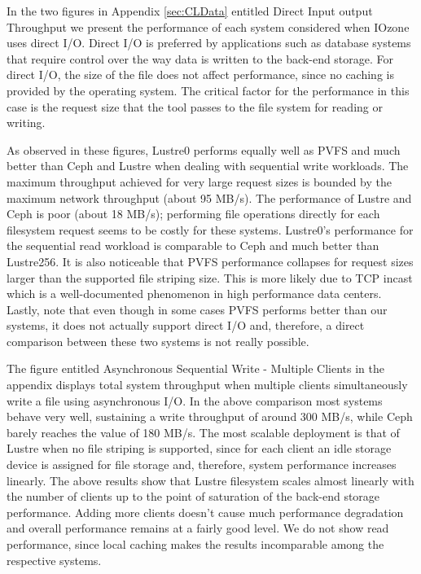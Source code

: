 \documentclass[11pt]{article}
\begin{document}
In the two figures in Appendix \ref{sec:CLData} entitled Direct Input output Throughput
we present the performance of each system considered when 
IOzone uses direct I/O. Direct I/O is preferred by applications such as 
database systems that require control over the way data is written to the 
back-end storage. For direct I/O, the size of the file does not affect 
performance, since no caching is provided by the operating system. The 
critical factor for the performance in this case is the request size that 
the tool passes to the file system for reading or writing.

As observed in these figures, Lustre0 performs equally well as PVFS and much 
better than Ceph and Lustre when dealing with sequential write workloads. 
The maximum throughput achieved for very large request sizes is bounded 
by the maximum network throughput (about 95 MB/s). The performance of 
Lustre and Ceph is poor (about 18 MB/s); performing file operations 
directly for each filesystem request seems to be costly for these systems. 
Lustre0’s performance for the sequential read workload is comparable to 
Ceph and much better than Lustre256. It is also noticeable that PVFS 
performance collapses for request sizes larger than the supported 
file striping size. This is more likely due to TCP incast which is a 
well-documented phenomenon in high performance data centers. Lastly, 
note that even though in some cases PVFS performs better than our 
systems, it does not actually support direct I/O and, therefore, a 
direct comparison between these two systems is not really possible.

The figure entitled Asynchronous Sequential Write - Multiple Clients 
in the appendix displays total system throughput when multiple clients 
simultaneously write a file using asynchronous I/O. In the above 
comparison most systems behave very well, sustaining a write throughput 
of around 300 MB/s, while Ceph barely reaches the value of 180 MB/s. 
The most scalable deployment is that of Lustre when no file striping 
is supported, since for each client an idle storage device is assigned 
for file storage and, therefore, system performance increases linearly. 
The above results show that Lustre filesystem scales almost linearly 
with the number of clients up to the point of saturation of the back-end 
storage performance. Adding more clients doesn't cause much performance 
degradation and overall performance remains at a fairly good level. We 
do not show read performance, since local caching makes the results 
incomparable among the respective systems.
\end{document}
